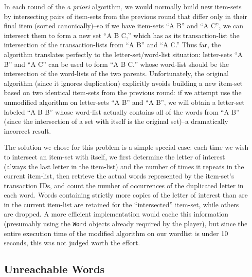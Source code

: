 \documentclass[11pt]{article}
\begin{document}
In each round of  the {\it a priori} algorithm, we would normally build new item-sets by intersecting pairs of item-sets from the previous round 
that differ only in their final item (sorted canonically)--so if we have item-sets ``A B'' and ``A C'', we can intersect them to form a new set ``A B C,''  which has as its transaction-list the intersection of the transaction-lists from ``A B'' and ``A C.''  Thus far, the algorithm translates perfectly to the letter-set/word-list situation: letter-sets ``A B'' and ``A C'' can be used to form ``A B C,'' whose word-list should be the intersection of the word-lists of the two parents.  Unfortunately, the original algorithm (since it ignores duplication) explicitly avoids building a new item-set based on two identical item-sets from the previous round:
if we attempt use the unmodified algorithm on letter-sets ``A B'' and ``A B'', we will obtain a letter-set labeled ``A B B'' whose word-list actually contains all of the words from ``A B'' (since the intersection of a set with itself is the original set)--a dramatically incorrect result.

The solution we chose for this problem is a simple special-case: each time we wish to intersect an item-set with itself, we first determine the letter of interest (always the last letter in the item-list) and the number of times it repeats in the current item-list, then
retrieve the actual words represented by the item-set's transaction IDs, and count the number of occurrences of the duplicated letter in each word.  Words containing strictly more copies of the letter of interest than are in the current item-list are retained for the ``intersected'' item-set, while others are dropped.  A more efficient implementation would cache this information (presumably using the {\tt Word} objects already required by the player), but since the entire execution time of the modified algorithm on our wordlist is under 10 seconds, this was not judged worth the effort.

\subsection{Unreachable Words}
\end{document}
